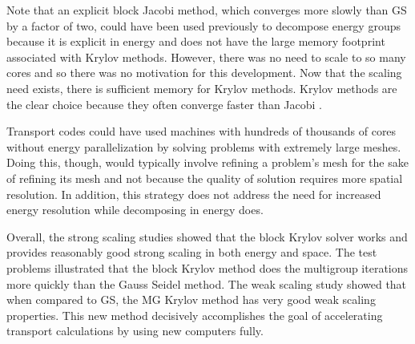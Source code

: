 Note that an explicit block Jacobi method, which converges more slowly than GS by a factor of two, could have been used previously to decompose energy groups because it is explicit in energy and does not have the large memory footprint associated with Krylov methods. However, there was no need to scale to so many cores and so there was no motivation for this development. Now that the scaling need exists, there is sufficient memory for Krylov methods. Krylov methods are the clear choice because they often converge faster than Jacobi \cite{LeVeque2007}. 

Transport codes could have used machines with hundreds of thousands of cores without energy parallelization by solving problems with extremely large meshes. Doing this, though, would typically involve refining a problem's mesh for the sake of refining its mesh and not because the quality of solution requires more spatial resolution. In addition, this strategy does not address the need for increased energy resolution while decomposing in energy does. 

Overall, the strong scaling studies showed that the block Krylov solver works and provides reasonably good strong scaling in both energy and space. The test problems illustrated that the block Krylov method does the multigroup iterations more quickly than the Gauss Seidel method. The weak scaling study showed that when compared to GS, the MG Krylov method has very good weak scaling properties. This new method decisively accomplishes the goal of accelerating transport calculations by using new computers fully.

